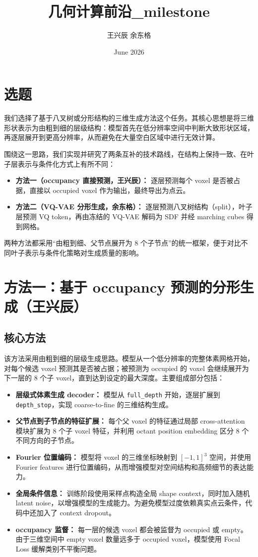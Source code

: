 \documentclass{article}
\title{几何计算前沿_milestone}
\author{王兴辰 余东格}
\date{June 2026}
\begin{document}
\maketitle


\section{选题}
我们选择了基于八叉树或分形结构的三维生成方法这个任务。其核心思想是将三维形状表示为由粗到细的层级结构：模型首先在低分辨率空间中判断大致形状区域，再逐层展开到更高分辨率，从而避免在大量空白区域中进行无效计算。

围绕这一思路，我们实现并研究了两条互补的技术路线，在结构上保持一致、在叶子层表示与条件化方式上有所不同：
\begin{itemize}
    \item \textbf{方法一（occupancy 直接预测，王兴辰）：} 逐层预测每个 voxel 是否被占据，直接以 occupied voxel 作为输出，最终导出为点云。
    \item \textbf{方法二（VQ-VAE 分形生成，余东格）：} 逐层预测八叉树结构（split），叶子层预测 VQ token，再由冻结的 VQ-VAE 解码为 SDF 并经 marching cubes 得到网格。
\end{itemize}
两种方法都采用“由粗到细、父节点展开为 8 个子节点”的统一框架，便于对比不同叶子表示与条件化策略对生成质量的影响。

\section{方法一：基于 occupancy 预测的分形生成（王兴辰）}

\subsection{核心方法}
该方法采用由粗到细的层级生成思路。模型从一个低分辨率的完整体素网格开始，对每个候选 voxel 预测其是否被占据；被预测为 occupied 的 voxel 会继续展开为下一层的 8 个子 voxel，直到达到设定的最大深度。主要组成部分包括：

\begin{itemize}
    \item \textbf{层级式体素生成 decoder：} 模型从 \texttt{full\_depth} 开始，逐层扩展到 \texttt{depth\_stop}，实现 coarse-to-fine 的三维结构生成。
    \item \textbf{父节点到子节点的特征扩展：} 每个父 voxel 的特征通过局部 cross-attention 模块扩展为 8 个子 voxel 特征，并利用 octant position embedding 区分 8 个不同方向的子节点。
    \item \textbf{Fourier 位置编码：} 模型将 voxel 的三维坐标映射到 $[-1,1]^3$ 空间，并使用 Fourier features 进行位置编码，从而增强模型对空间结构和高频细节的表达能力。
    \item \textbf{全局条件信息：} 训练阶段使用采样点构造全局 shape context，同时加入随机 latent noise，以增强模型的生成能力。为避免模型过度依赖真实点云条件，代码中还加入了 context dropout。
    \item \textbf{occupancy 监督：} 每一层的候选 voxel 都会被监督为 occupied 或 empty。由于三维空间中 empty voxel 数量远多于 occupied voxel，模型使用 Focal Loss 缓解类别不平衡问题。
\end{itemize}
\end{document}
